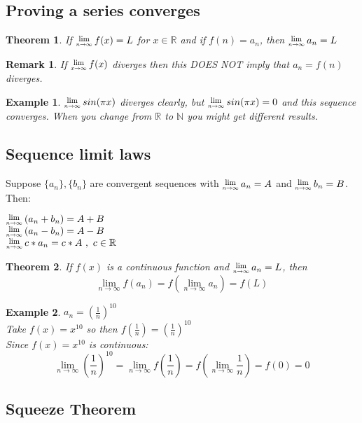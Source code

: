 \documentclass[12 pt]{article}
\newcommand{\Lim}[1]{\raisebox{0.5ex}{\scalebox{0.8}{$\displaystyle \lim_{#1}\;$}}}
\newcommand{\R}{\mathbb{R}}
\newcommand{\N}{\mathbb{N}}
\newcommand{\toinfty}{\rightarrow\infty}
\newtheorem*{exmp*}{Example}
\newtheorem*{thrm}{Theorem}
\newtheorem*{remark}{Remark}
\begin{document}
		\subsection{Proving a series converges}
		\begin{thrm}
			If $\Lim{n\toinfty}f(x)=L$ for $x\in\R$ and if $f(n)=a_n$,
			then $\Lim{n\toinfty}a_n=L$
		\end{thrm}

		\begin{remark}
			If $\Lim{x\toinfty}f(x)$ diverges then this DOES NOT imply that
			$a_n=f(n)$ diverges.
		\end{remark}
		\begin{exmp*}
			$\Lim{n\toinfty}sin(\pi x)$ diverges clearly, but
			$\Lim{n\toinfty}sin(\pi x) = 0$ and this sequence converges.
			When you change from $\R$ to $\N$ you might get different results.
		\end{exmp*}

		\subsection{Sequence limit laws}

		Suppose $\{a_n\},\{b_n\}$ are convergent sequences with $\Lim{n\toinfty}
		a_n=A$ and $\Lim{n\toinfty}b_n=B$. Then:
		\begin{center}$\Lim{n\toinfty}(a_n+b_n)=A+B$\\
			$\Lim{n\toinfty}(a_n-b_n)=A-B$\\
			$\Lim{n\toinfty}c*a_n=c*A\ ,\ c\in\R$
		\end{center}
		\begin{thrm}If $f(x)$ is a continuous function and $\Lim{n\toinfty}a_n=L$,
			then\\ $$\lim_{n\toinfty}f(a_n)=f(\lim_{n\toinfty}a_n)=f(L)$$
		\end{thrm}
		\begin{exmp*}
			$a_n=(\frac{1}{n})^{10}$\\
			Take $f(x)=x^{10}$ so then $f(\frac{1}{n})=(\frac{1}{n})^{10}$\\
			Since $f(x)=x^{10}$ is continuous:
			$$\lim_{n\toinfty}(\frac{1}{n})^{10}=\lim_{n\toinfty}f(\frac{1}{n})=f(\lim_{n\toinfty}\frac{1}{n})=f(0)=0$$
		\end{exmp*}

		\subsection{Squeeze Theorem}
\end{document}
